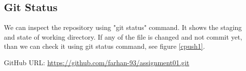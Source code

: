 \documentclass[paper=a4, fontsize=12pt]{scrartcl}
\numberwithin{equation}{section} %
\numberwithin{figure}{section} %
\numberwithin{table}{section} %
\begin{document}
\subsection{Git Status}
\par We can inspect the repository using "git status" command. It shows the staging and state of working directory. If any of the file is changed and not commit yet, than we can check it using git status command, see figure \ref{cpush1}.
\par
\par

\par GitHub URL: \url{https://github.com/farhan-93/assignment01.git}


 
\end{document}
